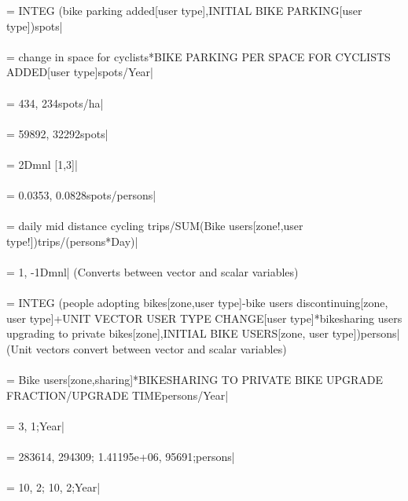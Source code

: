  =  INTEG (bike parking added[user type],INITIAL BIKE PARKING[user type])spots| \\ \\ 
 = change in space for cyclists*BIKE PARKING PER SPACE FOR CYCLISTS ADDED[user type]spots/Year| \\ \\ 
 = 434, 234spots/ha| \\ \\ 
 = 59892, 32292spots| \\ \\ 
 = 2Dmnl [1,3]| \\ \\ 
 = 0.0353, 0.0828spots/persons| \\ \\ 
 = daily mid distance cycling trips/SUM(Bike users[zone!,user type!])trips/(persons*Day)| \\ \\ 
 = 1, -1Dmnl| (Converts between vector and scalar variables) \\ \\ 
 =  INTEG (people adopting bikes[zone,user type]-bike users discontinuing[zone, user type]+UNIT VECTOR USER TYPE CHANGE[user type]*bikesharing users upgrading to private bikes[zone],INITIAL BIKE USERS[zone, user type])persons| (Unit vectors convert between vector and scalar variables) \\ \\ 
 = Bike users[zone,sharing]*BIKESHARING TO PRIVATE BIKE UPGRADE FRACTION/UPGRADE TIMEpersons/Year| \\ \\ 
 = 3, 1;Year| \\ \\ 
 = 283614, 294309; 1.41195e+06, 95691;persons| \\ \\ 
 = 10, 2; 10, 2;Year| \\ \\ 
